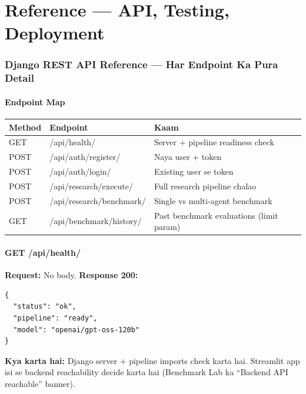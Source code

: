 \newpage

\part{Reference --- API, Testing, Deployment}

\section{Django REST API Reference --- Har Endpoint Ka Pura Detail}

\subsection{Endpoint Map}

\begin{longtable}{p{1.6cm} p{4.2cm} p{7.8cm}}
\toprule
\textbf{Method} & \textbf{Endpoint} & \textbf{Kaam} \\
\midrule
GET & /api/health/ & Server + pipeline readiness check \\
POST & /api/auth/register/ & Naya user + token \\
POST & /api/auth/login/ & Existing user se token \\
POST & /api/research/execute/ & Full research pipeline chalao \\
POST & /api/research/benchmark/ & Single vs multi-agent benchmark \\
GET & /api/benchmark/history/ & Past benchmark evaluations (limit param) \\
\bottomrule
\end{longtable}

\subsection{GET /api/health/}

\begin{codestorybox}
\textbf{Request:} No body. \textbf{Response 200:}
\begin{lstlisting}[style=jsonstyle]
{
  "status": "ok",
  "pipeline": "ready",
  "model": "openai/gpt-oss-120b"
}
\end{lstlisting}

\textbf{Kya karta hai:} Django server + pipeline imports check karta hai. Streamlit app isi se backend reachability decide karta hai (Benchmark Lab ka ``Backend API reachable'' banner).
\end{codestorybox}

